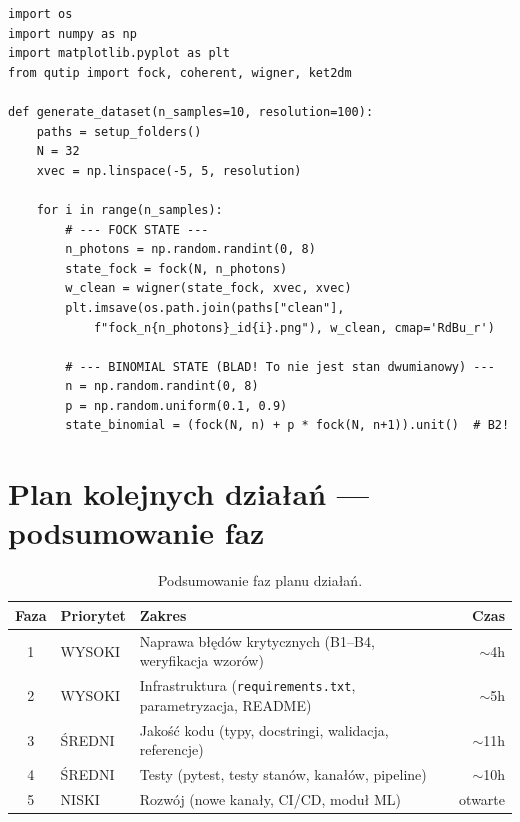 \documentclass[12pt,a4paper]{article}
\begin{document}
\begin{lstlisting}[caption={Generator zbioru danych (\texttt{generate.py}) --- fragment z błędem B2.}, label={lst:generate}]
import os
import numpy as np
import matplotlib.pyplot as plt
from qutip import fock, coherent, wigner, ket2dm

def generate_dataset(n_samples=10, resolution=100):
    paths = setup_folders()
    N = 32
    xvec = np.linspace(-5, 5, resolution)

    for i in range(n_samples):
        # --- FOCK STATE ---
        n_photons = np.random.randint(0, 8)
        state_fock = fock(N, n_photons)
        w_clean = wigner(state_fock, xvec, xvec)
        plt.imsave(os.path.join(paths["clean"],
            f"fock_n{n_photons}_id{i}.png"), w_clean, cmap='RdBu_r')

        # --- BINOMIAL STATE (BLAD! To nie jest stan dwumianowy) ---
        n = np.random.randint(0, 8)
        p = np.random.uniform(0.1, 0.9)
        state_binomial = (fock(N, n) + p * fock(N, n+1)).unit()  # B2!
\end{lstlisting}

\section{Plan kolejnych działań --- podsumowanie faz}
\label{sec:plan-podsumowanie}

\begin{table}[htbp]
\centering
\caption{Podsumowanie faz planu działań.}
\label{tab:fazy}
\begin{tabular}{@{}clp{7.5cm}r@{}}
\toprule
\textbf{Faza} & \textbf{Priorytet} & \textbf{Zakres} & \textbf{Czas} \\
\midrule
1 & WYSOKI  & Naprawa błędów krytycznych (B1--B4, weryfikacja wzorów) & $\sim$4h \\
2 & WYSOKI  & Infrastruktura (\texttt{requirements.txt}, parametryzacja, README) & $\sim$5h \\
3 & ŚREDNI  & Jakość kodu (typy, docstringi, walidacja, referencje) & $\sim$11h \\
4 & ŚREDNI  & Testy (pytest, testy stanów, kanałów, pipeline) & $\sim$10h \\
5 & NISKI   & Rozwój (nowe kanały, CI/CD, moduł ML) & otwarte \\
\bottomrule
\end{tabular}
\end{table}
\end{document}
